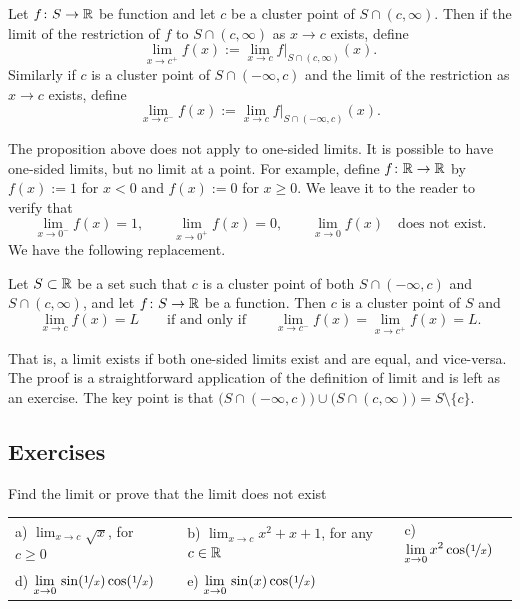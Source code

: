 \begin{defn} \label{defn:onesidedlimits}
Let $f \colon S \to {\mathbb{R}}$ be function and let $c$ be a cluster point of
$S \cap (c,\infty)$.  Then if the limit
of the restriction of $f$ to $S \cap (c,\infty)$ 
 as $x \to c$ exists, define
\begin{equation*}
\lim_{x \to c^+} f(x) := \lim_{x\to c} f|_{S \cap (c,\infty)}(x) .
\end{equation*}
Similarly if $c$ is a cluster point of 
$S \cap (-\infty,c)$ and the limit of the restriction as $x \to c$
exists, define
\begin{equation*}
\lim_{x \to c^-} f(x) := \lim_{x\to c} f|_{S \cap (-\infty,c)}(x) .
\end{equation*}
\end{defn}

The proposition above does not apply to one-sided limits.
It is possible to have one-sided limits, but no limit at a point.  For
example, define $f \colon {\mathbb{R}} \to {\mathbb{R}}$ by $f(x) := 1$ for $x < 0$ and
$f(x) :=
0$ for $x \geq 0$.  We leave it to the reader to verify that
\begin{equation*}
\lim_{x \to 0^-} f(x) = 1, \qquad
\lim_{x \to 0^+} f(x) = 0, \qquad
\lim_{x \to 0} f(x) \quad \text{does not exist.}
\end{equation*}
We have the following replacement.


\begin{prop} \label{prop:onesidedlimits}
Let $S \subset {\mathbb{R}}$ be a set such that $c$ is a cluster point
of both $S \cap (-\infty,c)$ and $S \cap (c,\infty)$, and let
$f \colon S \to {\mathbb{R}}$ be a function.  Then $c$ is a cluster point of $S$ and
\begin{equation*}
\lim_{x \to c} f(x) = L
\qquad \text{if and only if} \qquad
\lim_{x \to c^-} f(x) =
\lim_{x \to c^+} f(x) =
L .
\end{equation*}
\end{prop}

That is, a limit exists if both one-sided limits exist and are equal, and
vice-versa.  The
proof is a straightforward application of the definition of limit
and is left as an exercise.  The key point is that
$\bigl( S \cap (-\infty,c) \bigr) \cup \bigl( S \cap (c,\infty) \bigr)
= S \setminus \{ c \}$.

\subsection{Exercises}

\begin{exercise}
Find the limit or prove that the limit does not exist

\medskip

\noindent
\begin{tabular}{lllll}
a)
$\displaystyle
\lim_{x\to c} \sqrt{x}
$, for $c \geq 0$
& &
b)
$\displaystyle
\lim_{x\to c} x^2+x+1
$, for any $c \in {\mathbb{R}}$
& &
c)
$\displaystyle
\lim_{x\to 0} x^2 \cos (\nicefrac{1}{x})
$
\\
d)
$\displaystyle
\lim_{x\to 0}\, \sin(\nicefrac{1}{x}) \cos (\nicefrac{1}{x})
$
& &
e)
$\displaystyle
\lim_{x\to 0}\, \sin(x) \cos (\nicefrac{1}{x})
$ & 
\end{tabular}
\end{exercise}

